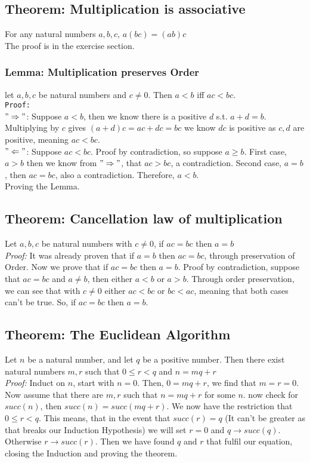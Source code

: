 \subsection{Theorem: Multiplication is associative}
For any natural numbers $a,b,c$, $a(bc) = (ab)c$\\
The proof is in the exercise section.

\subsubsection*{Lemma: Multiplication preserves Order}
let $a,b,c$ be natural numbers and $c\neq 0$. Then $a < b$ iff $ac < bc$.\\
\texttt{Proof:}\\
$"\Rightarrow"$: Suppose $a < b$, then we know there is a positive $d$ s.t. $a + d = b$. Multiplying by $c$ gives $(a+d)c = ac + dc = bc$ we know $dc$ is positive as $c,d$ are positive, meaning $ac < bc$.\\
$"\Leftarrow"$: Suppose $ac < bc$. Proof by contradiction, so suppose $a \geqslant b$. First case, $a > b$ then we know from $"\Rightarrow"$, that $ac > bc$, a contradiction. Second case, $a = b$, then $ac = bc$, also a contradiction. Therefore, $a < b$.\\
Proving the Lemma.

\subsection{Theorem: Cancellation law of multiplication}
Let $a,b,c$ be natural numbers with $c\neq0$, if $ac = bc$ then $a = b$\\
\textit{Proof:} It was already proven that if $a = b$ then $ac = bc$, through preservation of Order. Now we prove that if $ac = bc$ then $a = b$. Proof by contradiction, suppose that $ac = bc$ and $a\neq  b$, then either $a < b$ or $a >b$. Through order preservation, we can see that with $c\neq 0$ either $ac < bc$ or $bc < ac$, meaning that both cases can't be true. So, if $ac = bc$ then $a = b$.

\subsection{Theorem: The Euclidean Algorithm}
Let $n$ be a natural number, and let $q$ be a positive number. Then there exist natural numbers $m, r$ such that $0 \leqslant r < q$ and $n = mq + r$\\
\textit{Proof:} Induct on $n$, start with $n=0$. Then, $ 0 = mq + r$, we find that $m = r = 0$. Now assume that there are $m,r$ such that $n = mq + r$ for some $n$. now check for $succ(n)$, then $succ(n) = succ(mq + r)$. We now have the restriction that $0 \leqslant r < q$. This means, that in the event that $succ(r) = q$ (It can't be greater as that breaks our Induction Hypothesis) we will set $r=0$ and $q\rightarrow succ(q)$. Otherwise $r\rightarrow succ(r)$. Then we have found $q$ and $r$ that fulfil our equation, closing the Induction and proving the theorem.


